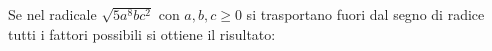 Se nel radicale $\sqrt{5 a^8 b c^2}$ con $a, b, c \geq 0$
si trasportano fuori dal segno di radice tutti i fattori possibili si ottiene 
il risultato: